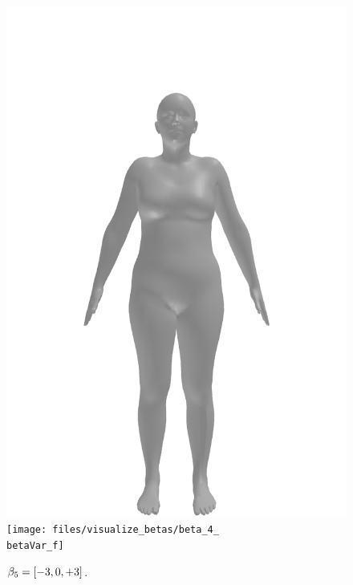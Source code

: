 \begin{figure}[ht!]
\begin{minipage}[b]{\textwidth}
        \includegraphics[width=\imgWidth]{files/visualize_betas/baseline_f}
        \texttt{[image: files/visualize\_betas/beta\_4\_\\betaVar\_f]}
        \caption[Effect of varying $\beta_5$ in SMPL.]{$\beta_5 = [-3, 0, +3]$.}
    \end{minipage}
\end{figure}

